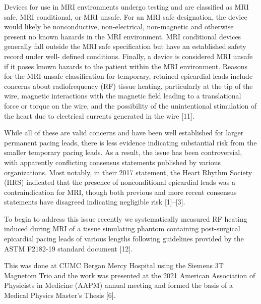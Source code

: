 Devices for use in MRI environments undergo testing
and are classified as MRI safe, MRI conditional, or MRI unsafe. For an MRI safe designation, the device would likely be
nonconductive, non-electrical, non-magnetic and otherwise present no known hazards in the MRI environment. MRI
conditional devices generally fall outside the MRI safe specification but have an established safety record under well-
defined conditions. Finally, a device is considered MRI unsafe if it poses known hazards to the patient within the MRI
environment. Reasons for the MRI unsafe classification for temporary, retained epicardial leads include concerns about
radiofrequency (RF) tissue heating, particularly at the tip of the wire, magnetic interactions with the magnetic field leading
to a translational force or torque on the wire, and the possibility of the unintentional stimulation of the heart due to electrical
currents generated in the wire [11]. 


While all of these are valid concerns and have been well established for larger permanent
pacing leads, there is less evidence indicating substantial risk from the smaller temporary pacing leads. As a result, the issue
has been controversial, with apparently conflicting consensus statements published by various organizations. Most notably,
in their 2017 statement, the Heart Rhythm Society (HRS) indicated that the presence of nonconditional epicardial leads was
a contraindication for MRI, though both previous and more recent consensus statements have disagreed indicating negligible
risk [1]–[3].


To begin to address this issue recently we systematically measured RF
heating induced during MRI of a tissue simulating phantom containing
post-surgical epicardial pacing leads of various lengths following
guidelines provided by the ASTM F2182-19 standard document [12].


This was done at CUMC Bergan Mercy Hospital using the Siemens 3T
Magnetom Trio and the work was presented at the 2021 American
Association of Physicists in Medicine (AAPM) annual meeting and
formed the basis of a Medical Physics Master’s Thesis [6].

